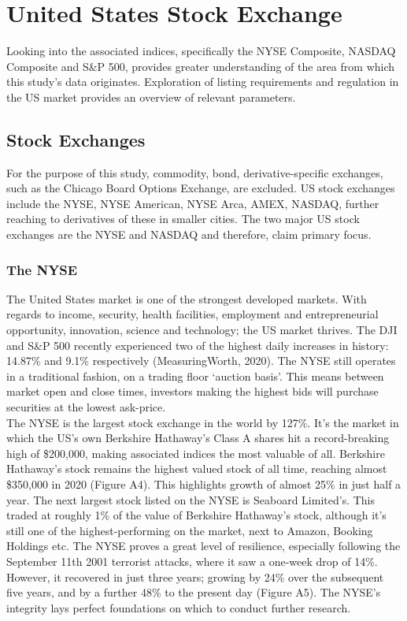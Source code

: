 \documentclass[11pt, english]{article}
\begin{document}
\newpage

	\section{United States Stock Exchange}

	Looking into the associated indices, specifically the NYSE Composite, NASDAQ Composite and S\&P 500, provides greater understanding of the area from which this study’s data originates. Exploration of listing requirements and regulation in the US market provides an overview of relevant parameters.

	\subsection{Stock Exchanges}

	For the purpose of this study, commodity, bond, derivative-specific exchanges, such as the Chicago Board Options Exchange, are excluded. US stock exchanges include the NYSE, NYSE American, NYSE Arca, AMEX, NASDAQ, further reaching to derivatives of these in smaller cities. The two major US stock exchanges are the NYSE and NASDAQ and therefore, claim primary focus.

		\subsubsection{The NYSE}

		The United States market is one of the strongest developed markets. With regards to income, security, health facilities, employment and entrepreneurial opportunity, innovation, science and technology; the US market thrives. The DJI and S\&P 500 recently experienced two of the highest daily increases in history: 14.87\% and 9.1\% respectively (MeasuringWorth, 2020). The NYSE still operates in a traditional fashion, on a trading floor `auction basis'. This means between market open and close times, investors making the highest bids will purchase securities at the lowest ask-price.\\

		The NYSE is the largest stock exchange in the world by 127\%. It’s the market in which the US’s own Berkshire Hathaway’s Class A shares hit a record-breaking high of \$200,000, making associated indices the most valuable of all. Berkshire Hathaway’s stock remains the highest valued stock of all time, reaching almost \$350,000 in 2020 (Figure A4). This highlights growth of almost 25\% in just half a year. The next largest stock listed on the NYSE is Seaboard Limited’s. This traded at roughly 1\% of the value of Berkshire Hathaway’s stock, although it’s still one of the highest-performing on the market, next to Amazon, Booking Holdings etc. The NYSE proves a great level of resilience, especially following the September 11th 2001 terrorist attacks, where it saw a one-week drop of 14\%. However, it recovered in just three years; growing by 24\% over the subsequent five years, and by a further 48\% to the present day (Figure A5). The NYSE’s integrity lays perfect foundations on which to conduct further research.
\end{document}
